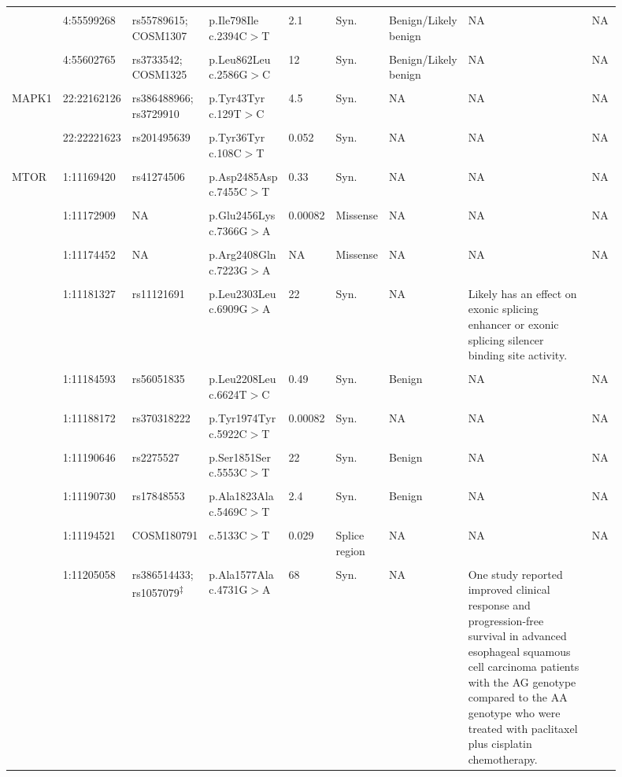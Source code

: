 \begin{landscape}
\begin{longtable}{p{0.07\linewidth}|p{0.09\linewidth}p{0.11\linewidth}p{0.1\linewidth}p{0.05\linewidth}p{0.065\linewidth}p{0.11\linewidth}p{0.25\linewidth}p{0.05\linewidth}}
		\\
		\\
		& 4:55599268 & rs55789615; COSM1307 & p.Ile798Ile c.2394C$>$T & 2.1 & Syn. & Benign/Likely benign & NA & NA
		\\
		\\
		& 4:55602765 & rs3733542; COSM1325 & p.Leu862Leu c.2586G$>$C & 12 & Syn. & Benign/Likely benign & NA & NA
		\\
		\\
		\hline
		MAPK1 & 22:22162126 & rs386488966; rs3729910 & p.Tyr43Tyr c.129T$>$C & 4.5 & Syn. & NA & NA & NA
		\\
		\\
		& 22:22221623 & rs201495639 & p.Tyr36Tyr c.108C$>$T & 0.052 & Syn. & NA & NA & NA
		\\
		\\
		\hline
		MTOR & 1:11169420 & rs41274506 & p.Asp2485Asp c.7455C$>$T & 0.33 & Syn. & NA & NA & NA
		\\
		\\
		& 1:11172909 & NA & p.Glu2456Lys c.7366G$>$A & 0.00082 & Missense & NA & NA & NA
		\\
		\\
		& 1:11174452 & NA & p.Arg2408Gln c.7223G$>$A & NA & Missense & NA & NA & NA
		\\
		\\
		& 1:11181327 & rs11121691 & p.Leu2303Leu c.6909G$>$A & 22 & Syn. & NA & Likely has an effect on exonic splicing enhancer or exonic splicing silencer binding site activity. & \cite{Zining2016}
		\\
		\\
		& 1:11184593 & rs56051835 & p.Leu2208Leu c.6624T$>$C & 0.49 & Syn. & Benign & NA & NA
		\\
		\\
		& 1:11188172 & rs370318222 & p.Tyr1974Tyr c.5922C$>$T & 0.00082 & Syn. & NA & NA & NA
		\\
		\\
		& 1:11190646 & rs2275527 & p.Ser1851Ser c.5553C$>$T & 22 & Syn. & Benign & NA & NA
		\\
		\\
		& 1:11190730 & rs17848553 & p.Ala1823Ala c.5469C$>$T & 2.4 & Syn. & Benign & NA & NA
		\\
		\\
		& 1:11194521 & COSM180791 & c.5133C$>$T & 0.029 & Splice region & NA & NA & NA
		\\
		\\
		& 1:11205058 & rs386514433; rs1057079\textsuperscript{$\ddagger$} & p.Ala1577Ala c.4731G$>$A & 68 & Syn. & NA & One study reported improved clinical response and progression-free survival in advanced esophageal squamous cell carcinoma patients with the AG genotype compared to the AA genotype who were treated with paclitaxel plus cisplatin chemotherapy. & \cite{Liu2016}

\end{longtable}
\end{landscape}
